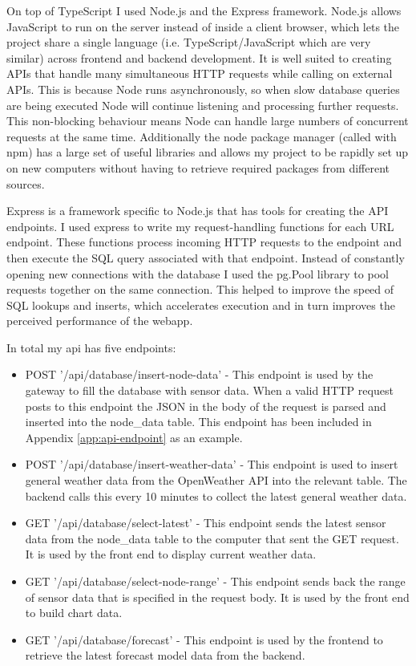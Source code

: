 On top of TypeScript I used Node.js and the Express framework. Node.js allows
JavaScript to run on the server instead of inside a client browser, which lets
the project share a single language (i.e. TypeScript/JavaScript which are very
similar) across frontend and backend development. It is well suited to creating
APIs that handle many simultaneous HTTP requests while calling on external APIs.
This is because Node runs asynchronously, so when slow database queries are
being executed Node will continue listening and processing further requests.
This non-blocking behaviour means Node can handle large numbers of concurrent
requests at the same time. Additionally the node package manager (called with
npm) has a large set of useful libraries and allows my project to be rapidly set
up on new computers without having to retrieve required packages from different
sources.

Express is a framework specific to Node.js that has tools for creating the API
endpoints. I used express to write my request-handling functions for each URL
endpoint. These functions process incoming HTTP requests to the endpoint and
then execute the SQL query associated with that endpoint. Instead of constantly
opening new connections with the database I used the pg.Pool library
\cite{pgpool} to pool requests together on the same connection. This helped to
improve the speed of SQL lookups and inserts, which accelerates execution and in
turn improves the perceived performance of the webapp.

In total my api has five endpoints:

\begin{itemize}
    \item POST '/api/database/insert-node-data' - This endpoint is used by the
          gateway to fill the database with sensor data. When a valid HTTP
          request posts to this endpoint the JSON in the body of the request is
          parsed and inserted into the node\_data table. This endpoint has been
          included in Appendix \ref{app:api-endpoint} as an example.
    \item POST '/api/database/insert-weather-data' - This endpoint is used to
          insert general weather data from the OpenWeather API into the relevant
          table. The backend calls this every 10 minutes to collect the latest
          general weather data.
    \item GET '/api/database/select-latest' - This endpoint sends the latest
          sensor data from the node\_data table to the computer that sent the
          GET request. It is used by the front end to display current weather
          data.
    \item GET '/api/database/select-node-range' - This endpoint sends back the
          range of sensor data that is specified in the request body. It is used
          by the front end to build chart data.
    \item GET '/api/database/forecast' - This endpoint is used by the frontend
          to retrieve the latest forecast model data from the backend.
\end{itemize}

